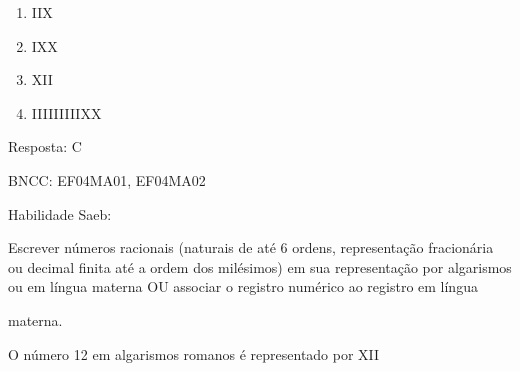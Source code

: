 \begin{enumerate}
\def\labelenumi{\alph{enumi})}
\item
  IIX
\item
  IXX
\item
  XII
\item
  IIIIIIIIIXX
\end{enumerate}

Resposta: C

BNCC: EF04MA01, EF04MA02

Habilidade Saeb:

Escrever números racionais (naturais de até 6 ordens, representação
fracionária ou decimal finita até a ordem dos milésimos) em sua
representação por algarismos ou em língua materna OU associar o registro
numérico ao registro em língua

materna.

O número 12 em algarismos romanos é representado por XII
